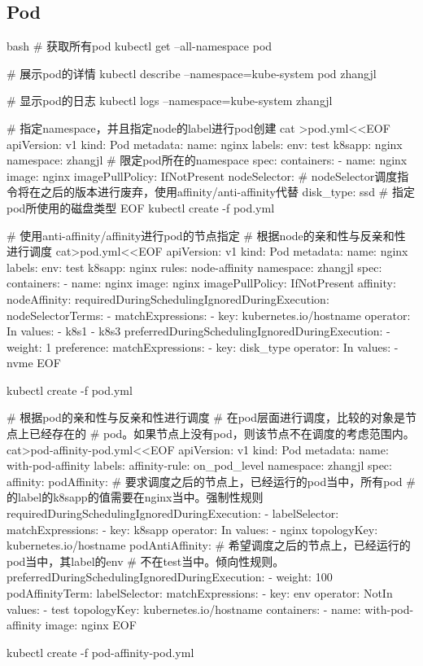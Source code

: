 \subsection{Pod}
\begin{code-block}{bash}
# 获取所有pod
kubectl get --all-namespace pod

# 展示pod的详情
kubectl describe --namespace=kube-system pod zhangjl

# 显示pod的日志
kubectl logs --namespace=kube-system zhangjl

# 指定namespace，并且指定node的label进行pod创建
cat >pod.yml<<EOF
apiVersion: v1
kind: Pod
metadata:
  name: nginx
  labels:
    env: test
    k8sapp: nginx
  namespace: zhangjl # 限定pod所在的namespace
spec:
  containers:
  - name: nginx
    image: nginx
    imagePullPolicy: IfNotPresent
  nodeSelector: # nodeSelector调度指令将在之后的版本进行废弃，使用affinity/anti-affinity代替
    disk_type: ssd # 指定pod所使用的磁盘类型
EOF
kubectl create -f pod.yml

# 使用anti-affinity/affinity进行pod的节点指定
# 根据node的亲和性与反亲和性进行调度
cat>pod.yml<<EOF
apiVersion: v1
kind: Pod
metadata:
  name: nginx
  labels:
    env: test
    k8sapp: nginx
    rules: node-affinity
  namespace: zhangjl
spec:
  containers:
  - name: nginx
    image: nginx
    imagePullPolicy: IfNotPresent
  affinity:
    nodeAffinity:
      requiredDuringSchedulingIgnoredDuringExecution:
        nodeSelectorTerms:
        - matchExpressions:
          - key: kubernetes.io/hostname
            operator: In
            values:
            - k8s1
            - k8s3
      preferredDuringSchedulingIgnoredDuringExecution:
      - weight: 1
        preference:
          matchExpressions:
          - key: disk_type
            operator: In
            values:
            - nvme
EOF

kubectl create -f pod.yml

# 根据pod的亲和性与反亲和性进行调度
# 在pod层面进行调度，比较的对象是节点上已经存在的
# pod。如果节点上没有pod，则该节点不在调度的考虑范围内。
cat>pod-affinity-pod.yml<<EOF
apiVersion: v1
kind: Pod
metadata:
  name: with-pod-affinity
  labels:
    affinity-rule: on_pod_level
  namespace: zhangjl
spec:
  affinity:
    podAffinity:
      # 要求调度之后的节点上，已经运行的pod当中，所有pod
      # 的label的k8sapp的值需要在nginx当中。强制性规则
      requiredDuringSchedulingIgnoredDuringExecution:
      - labelSelector:
          matchExpressions:
          - key: k8sapp
            operator: In
            values:
            - nginx
        topologyKey: kubernetes.io/hostname
    podAntiAffinity:
      # 希望调度之后的节点上，已经运行的pod当中，其label的env
      # 不在test当中。倾向性规则。
      preferredDuringSchedulingIgnoredDuringExecution:
      - weight: 100
        podAffinityTerm:
          labelSelector:
            matchExpressions:
            - key: env
              operator: NotIn
              values:
              - test
          topologyKey: kubernetes.io/hostname
  containers:
  - name: with-pod-affinity
    image: nginx
EOF

kubectl create -f pod-affinity-pod.yml
\end{code-block}
